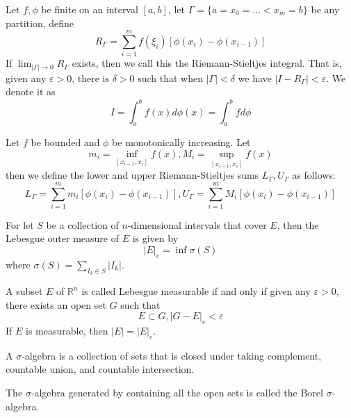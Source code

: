 \documentclass[openany]{book}
\newcommand{\R}{\mathbb{R}}
\begin{document}
\begin{defn}
    Let $f,\phi$ be finite on an interval $[a,b]$, let $\Gamma=\{a=x_0=\dots<x_m=b\}$ be any partition, define 
    \begin{equation*}
        R_\Gamma=\sum_{i=1}^mf(\xi_i)\left[\phi(x_i)-\phi(x_{i-1})\right]
    \end{equation*}
    If $\lim_{|\Gamma|\to0}R_\Gamma$ exists, then we call this the Riemann-Stieltjes integral. That is, given any $\varepsilon>0$, there is $\delta>0$ such that when $|\Gamma|<\delta$ we have $|I-R_\Gamma|<\varepsilon$. We denote it as 
    \begin{equation*}
        I=\int_a^bf(x)d\phi(x)=\int_a^b fd\phi
    \end{equation*}
\end{defn}
\begin{defn}
    Let $f$ be bounded and $\phi$ be monotonically increasing. Let 
    \begin{equation*}
        m_i=\inf_{[x_{i-1},x_i]}f(x), M_i=\sup_{[x_{i-1}, x_i]}f(x)
    \end{equation*}
    then we define the lower and upper Riemann-Stieltjes sums $L_\Gamma, U_\Gamma$ as follows:
    \begin{equation*}
        L_\Gamma=\sum_{i=1}^mm_i[\phi(x_i)-\phi(x_{i-1})], U_\Gamma=\sum_{i=1}^mM_i[\phi(x_i)-\phi(x_{i-1})]
    \end{equation*}
\end{defn}
\begin{defn}
    For let $S$ be a collection of $n$-dimensional intervals that cover $E$, then the Lebesgue outer measure of $E$ is given by
    \begin{equation*}
        |E|_e=\inf\sigma(S)
    \end{equation*}
    where $\sigma(S)=\sum_{I_k\in S}|I_k|$.
\end{defn}
\begin{defn}
    A subset $E$ of $\R^n$ is called Lebesgue measurable if and only if given any $\varepsilon>0$, there exists an open set $G$ such that 
    \begin{equation*}
        E\subset G, |G-E|_e<\varepsilon
    \end{equation*}
    If $E$ is measurable, then $|E|=|E|_e$.
\end{defn}
\begin{defn}
    A $\sigma$-algebra is a collection of sets that is closed under taking complement, countable union, and countable intersection.

    The $\sigma$-algebra generated by containing all the open sets is called the Borel $\sigma$-algebra.
\end{defn}
\end{document}
